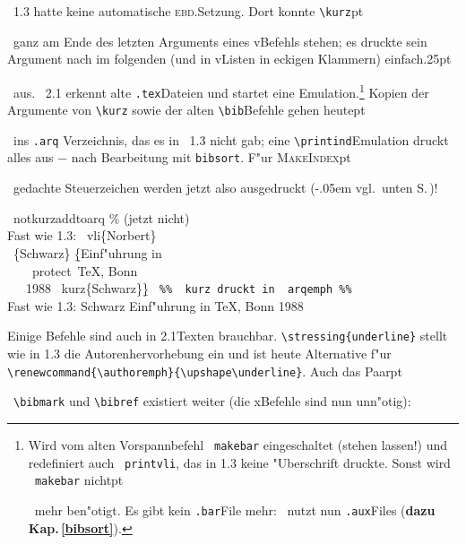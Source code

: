 \documentclass[12pt,a4paper]{article}
\newcommand{\pdfko}[1]{\kern #1pt
                          \strut\ignorespaces}%
\newcommand{\pbs}{\string\ \unskip}
\newcommand{\bs}{\protect\pbs}
\begin{document}
\vspace{.075ex}%
\BibArts~1.3 hatte keine automatische \textsc{ebd.}\hy Setzung. 
Dort konnte \verb|\kurz|\pdfko{1}\ 
ganz am Ende des letzten Arguments 
eines v\fhy Befehls stehen; es druckte sein Argument nach 
\textsf{im folgenden} (und in v\fhy Listen in eckigen Klammern)
einfach\pdfko{.25}\  
aus. \BibArts~2.1 erkennt alte 
\hspace*{-.15em}\texttt{.tex}\hy Dateien und startet eine 
Emulation.\footnote{Wird vom alten Vorspannbefehl 
\texttt{\bs makebar} eingeschaltet (stehen lassen!) und redefiniert auch 
\hspace{-.1em}\texttt{\bs printvli}, das in 1.3 keine "Uberschrift
druckte. Sonst wird \texttt{\bs makebar} nicht\pdfko{1}\
mehr ben"otigt. Es gibt kein \hspace*{-.15em}\texttt{.bar}\hy File mehr: 
\BibArts\ nutzt nun \hspace{-.25em}\texttt{.aux}\hy Files 
(\textbf{dazu Kap.\,\ref{bibsort}}).}
Kopien der Argumente von \verb|\kurz| sowie der alten 
\verb|\bib|\hy Befehle gehen heute\pdfko{1.125}\  
ins \hspace*{-.15em}\texttt{.arq}\hy 
Verzeichnis, das es in \BibArts~1.3 nicht gab; eine 
\verb|\printind|\hy Emulation druckt alles aus $-$ nach Bearbeitung 
mit \texttt{bibsort}. F"ur \textsc{MakeIndex}\pdfko{1.25}\  
gedachte Steuerzeichen werden jetzt also ausgedruckt 
(\kern -.05em vgl.\ unten S.\,\pageref{subitem})!

\vspace{-.625ex}
\Doppelbox
{      \bs notkurzaddtoarq \% (jetzt nicht)
    \\ Fast wie 1.3: \bs vli\{Norbert\} 
    \\ \ \{Schwarz\} \b{\{}Einf"uhrung in 
    \\ \ \ \ \bs protect\bs TeX, Bonn
    \\ \ \ \ 1988 \bs kurz\{Schwarz\}\b{\}}
}
{\notkurzaddtoarq
  \texttt{ \footnotesize \%\% \bs kurz druckt in \bs arqemph \%\%} \\[.2ex]
    Fast wie 1.3: \printonlyvli{Norbert} 
                {Schwarz} {Einf"uhrung in 
                \protect\TeX, Bonn
    1988 }
}

\vspace{-.125ex}\noindent
Einige Befehle sind auch in 2.1\hy Texten
brauchbar. \verb|\stressing{underline}| stellt wie in 1.3 die 
Autorenhervorhebung ein und ist heute Alternative f"ur 
\verb|\renewcommand{\authoremph}{\upshape\underline}|. Auch 
das Paar\pdfko{1.125}\  
\verb|\bibmark| und \verb|\bibref| existiert weiter 
(die x\fhy Befehle sind nun unn"otig):
\end{document}
